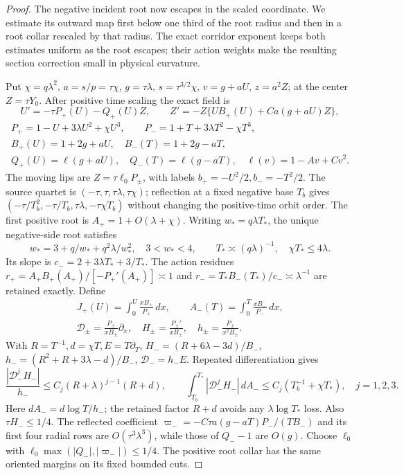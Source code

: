 \begin{proof}
The negative incident root now escapes in the scaled coordinate.
We estimate its outward map first below one third of the root radius and then
in a root collar rescaled by that radius. The exact corridor exponent
keeps both estimates uniform as the root escapes; their action weights
make the resulting section correction small in physical curvature.

Put \(\chi=q\lambda^2\), \(a=s/p=\tau\chi\),
\(g=\tau\lambda\), \(s=\tau^{3/2}\chi\),
\(v=g+aU\), \(z=a^2Z\); at the center \(Z=\tau Y_0\).
After positive time scaling the exact field is
\[
 U'=-\tau P_+(U)-Q_+(U)Z,\qquad
 Z'=-Z\{UB_+(U)+Ca(g+aU)Z\},
\]
\begin{equation}\label{deg:far-polynomials}
 \begin{gathered}
 P_+=1-U+3\lambda U^2+\chi U^3,\qquad
 P_-=1+T+3\lambda T^2-\chi T^3,\\
 B_+(U)=1+2g+aU,\quad B_-(T)=1+2g-aT,\\
 Q_+(U)=\ell(g+aU),\quad Q_-(T)=\ell(g-aT),\quad
 \ell(v)=1-Av+Cv^2.
 \end{gathered}
\end{equation}
The moving lips are \(Z=\tau\ell_0P_\pm\), with labels
\(b_+=-U^2/2,b_-=-T^2/2\). The source quartet is
\((-\tau,\tau,\tau\lambda,\tau\chi)\); reflection at a fixed
negative base \(T_b\) gives
\((-\tau/T_b^2,-\tau/T_b,\tau\lambda,-\tau\chi T_b)\)
without changing the positive-time orbit order.
The first positive root is \(A_+=1+O(\lambda+\chi)\).
Writing \(w_*=q\lambda T_*\), the unique negative-side root satisfies
\begin{equation}\label{deg:far-roots}
 w_*=3+q/w_*+q^2\lambda/w_*^2,\quad 3<w_*<4,\qquad
 T_*\asymp(q\lambda)^{-1},\quad \chi T_*\le4\lambda.
\end{equation}
Its slope is \(c_-=2+3\lambda T_*+3/T_*\). The action residues
\(r_+=A_+B_+(A_+)/[-P_+'(A_+)]\asymp1\) and
\(r_-=T_*B_-(T_*)/c_-\asymp\lambda^{-1}\) are retained exactly.
Define
\[
 \begin{gathered}
 J_+(U)=\int_0^U\frac{xB_+}{P_+}\,dx,\qquad
 A_-(T)=\int_0^T\frac{xB_-}{P_-}\,dx,\\
 \mathcal D_\pm=\frac{P_\pm}{xB_\pm}\partial_x,\quad
 H_\pm=\frac{P_\pm'}{xB_\pm},\quad h_\pm=\frac{P_\pm}{x^2B_\pm}.
 \end{gathered}
\]
With \(R=T^{-1},d=\chi T,E=T\partial_T\),
\(H_-=(R+6\lambda-3d)/B_-\),
\(h_-=(R^2+R+3\lambda-d)/B_-\), \(\mathcal D_-=h_-E\).
Repeated differentiation gives
\begin{equation}\label{deg:far-action-bound}
 \frac{|\mathcal D_-^jH_-|}{h_-}
 \le C_j(R+\lambda)^{j-1}(R+d),\qquad
 \int_{T_b}^{T_*}|\mathcal D_-^jH_-|\,dA_-
 \le C_j(T_b^{-1}+\chi T_*),\quad j=1,2,3.
\end{equation}
Here \(dA_-=d\log T/h_-\); the retained factor \(R+d\) avoids
any \(\lambda\log T_*\) loss. Also \(\tau H_-\le1/4\).
The reflected coefficient \(\varpi_-=-C\tau a(g-aT)P_-/(TB_-)\)
and its first four radial rows are \(O(\tau^3\lambda^3)\), while
those of \(Q_--1\) are \(O(g)\). Choose \(\ell_0\) with
\(\ell_0\max(|Q_-|,|\varpi_-|)\le1/4\). The positive root
collar has the same oriented margins on its fixed bounded cuts.


\end{proof}
